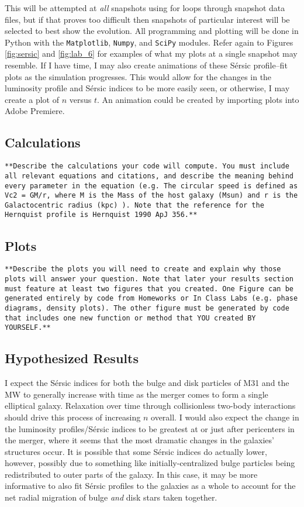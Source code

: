 \documentclass[twocolumn]{aastex631}
\begin{document}
This will be attempted at \emph{all} snapshots using for loops through snapshot data files, but if that proves too difficult then snapshots of particular interest will be selected to best show the evolution. All programming and plotting will be done in Python with the \texttt{Matplotlib}, \texttt{Numpy}, and \texttt{SciPy} modules. Refer again to Figures \ref{fig:sersic} and \ref{fig:lab_6} for examples of what my plots at a single snapshot may resemble. If I have time, I may also create animations of these S\'{e}rsic profile--fit plots as the simulation progresses. This would allow for the changes in the luminosity profile and S\'{e}rsic indices to be more easily seen, or otherwise, I may create a plot of $n$ versus $t$. An animation could be created by importing plots into Adobe Premiere.

\subsection{Calculations}
\texttt{**Describe the calculations your code will compute. You must include all relevant equations and citations, and describe the meaning behind every parameter in the equation (e.g. The circular speed is defined as Vc2 = GM/r, where M is the Mass of the host galaxy (Msun) and r is the Galactocentric radius (kpc) ). Note that the reference for the Hernquist profile is Hernquist 1990 ApJ 356.**}

\subsection{Plots}
\texttt{**Describe the plots you will need to create and explain why those plots will answer your question. Note that later your results section must feature at least two figures that you created. One Figure can be generated entirely by code from Homeworks or In Class Labs (e.g. phase diagrams, density plots). The other figure must be generated by code that includes one new function or method that YOU created BY YOURSELF.**}

\subsection{Hypothesized Results}
I expect the S\'{e}rsic indices for both the bulge and disk particles of M31 and the MW to generally increase with time as the merger comes to form a single elliptical galaxy. Relaxation over time through collisionless two-body interactions should drive this process of increasing $n$ overall. I would also expect the change in the luminosity profiles/S\'{e}rsic indices to be greatest at or just after pericenters in the merger, where it seems that the most dramatic changes in the galaxies' structures occur. It is possible that some S\'{e}rsic indices do actually lower, however, possibly due to something like initially-centralized bulge particles being redistributed to outer parts of the galaxy. In this case, it may be more informative to also fit S\'{e}rsic profiles to the galaxies as a whole to account for the net radial migration of bulge \emph{and} disk stars taken together.
\end{document}
